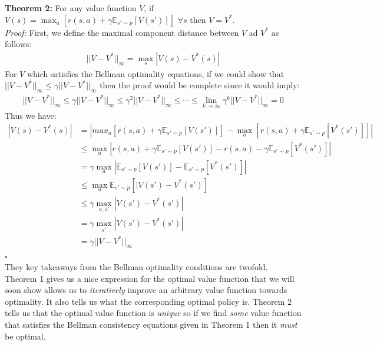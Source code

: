 \noindent\textbf{Theorem 2:} For any value function $V$, if $V(s) = \max_a[r(s, a) + \gamma \mathbb{E}_{s' \sim p}[V(s')]]$ $\forall s$ then $V = V^*$.\\
\textit{Proof:} First, we define the maximal component distance between $V$ ad $V^*$ as follows:
\begin{align*}
    ||V - V^*||_{\infty} = \max_s |V(s) - V^*(s)|
\end{align*}
For $V$ which satisfies the Bellman optimality equations, if we could show that $||V - V^*||_\infty \leq \gamma ||V - V^*||_{\infty}$ then the proof would be complete since it would imply:
\begin{align*}
    ||V - V^*||_{\infty} \leq \gamma ||V - V^*||_\infty \leq \gamma^2||V - V^*||_\infty \leq \cdots \leq \lim_{k \rightarrow \infty} \gamma^k||V - V^*||_\infty = 0
\end{align*}
Thus we have:
\begin{align*}
    |V(s) - V^*(s)| &= |max_a[r(s, a) + \gamma \mathbb{E}_{s' \sim p}[V(s')]] - \max_a[r(s, a) + \gamma\mathbb{E}_{s' \sim p}[V^*(s')]]|\\
    & \leq \max_a |r(s, a) + \gamma\mathbb{E}_{s' \sim p}[V(s')] - r(s, a) - \gamma \mathbb{E}_{s' \sim p}[V^*(s')]|\\
    &= \gamma\max_a|\mathbb{E}_{s' \sim p}[V(s')] - \mathbb{E}_{s' \sim p}[V^*(s')]|\\
    & \leq \max_{a} \mathbb{E}_{s' \sim p}[|V(s') - V^*(s')]\\
    & \leq \gamma \max_{a, s'}|V(s') - V^*(s')|\\
    &= \gamma \max_{s'}|V(s') - V^*(s')|\\
    &= \gamma ||V - V^*||_{\infty}
\end{align*} $\square$\\

They key takeaways from the Bellman optimality conditions are twofold. Theorem 1 gives us a nice expression for the optimal value function that we will soon show allows us to \textit{iteratively} improve an arbitrary value function towards optimality. It also tells us what the corresponding optimal policy is. Theorem 2 tells us that the optimal value function is \textit{unique} so if we find \textit{some} value function that satisfies the Bellman consistency equations given in Theorem 1 then it \textit{must} be optimal. 

